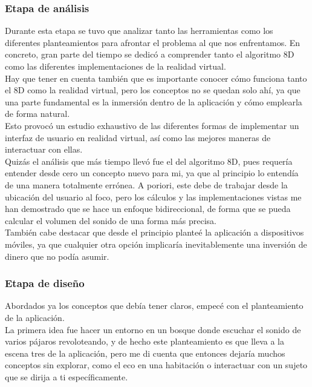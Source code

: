 \subsubsection{Etapa de análisis}

\quad Durante esta etapa se tuvo que analizar tanto las herramientas como los  diferentes planteamientos para afrontar el problema al que nos enfrentamos. En concreto, gran parte del tiempo se dedicó a comprender tanto el algoritmo 8D como las diferentes implementaciones de la realidad virtual.\\

\quad Hay que tener en cuenta también que es importante  conocer cómo funciona tanto el 8D como la realidad virtual, pero los conceptos no se quedan solo ahí, ya que una parte fundamental es la inmersión dentro de la aplicación y cómo emplearla de forma natural.\\

\quad Esto provocó un estudio exhaustivo de las diferentes formas de implementar un interfaz de usuario en realidad virtual, así como las mejores maneras de interactuar con ellas.\\

\quad Quizás el análisis que más tiempo llevó fue el del algoritmo 8D, pues requería entender desde cero un concepto nuevo para mi, ya que al principio lo entendía de una manera totalmente errónea. A poriori, este debe de trabajar desde la ubicación del usuario al foco, pero los cálculos y las implementaciones vistas me han demostrado que se hace un enfoque bidireccional, de forma que se pueda calcular el volumen del sonido de una forma más precisa.\\

\quad También cabe destacar que desde el principio planteé la aplicación a dispositivos móviles, ya que cualquier otra opción implicaría inevitablemente una inversión de dinero que no podía asumir.\\

\subsubsection{Etapa de diseño} 

\quad Abordados ya los conceptos que debía tener claros, empecé con el planteamiento de la aplicación.\\

\quad La primera idea fue hacer un entorno en un bosque donde escuchar el sonido de varios pájaros revoloteando, y de hecho este planteamiento es que lleva a la escena tres de la aplicación, pero me di cuenta que entonces dejaría muchos conceptos sin explorar, como el eco en una habitación o interactuar con un sujeto que se dirija a ti específicamente.


